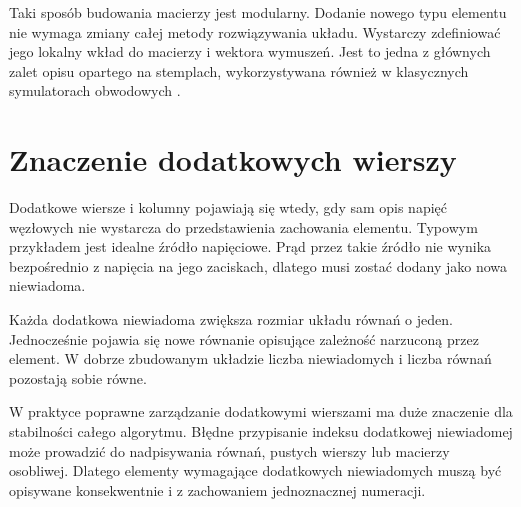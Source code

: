 Taki sposób budowania macierzy jest modularny. Dodanie nowego typu elementu nie wymaga zmiany całej metody rozwiązywania układu. Wystarczy zdefiniować jego lokalny wkład do macierzy i wektora wymuszeń. Jest to jedna z głównych zalet opisu opartego na stemplach, wykorzystywana również w klasycznych symulatorach obwodowych \cite{nagel1975spice2,kundert1995designer}.

\section{Znaczenie dodatkowych wierszy}
\label{sec:znaczenie-dodatkowych-wierszy}

Dodatkowe wiersze i kolumny pojawiają się wtedy, gdy sam opis napięć węzłowych nie wystarcza do przedstawienia zachowania elementu. Typowym przykładem jest idealne źródło napięciowe. Prąd przez takie źródło nie wynika bezpośrednio z napięcia na jego zaciskach, dlatego musi zostać dodany jako nowa niewiadoma.

Każda dodatkowa niewiadoma zwiększa rozmiar układu równań o jeden. Jednocześnie pojawia się nowe równanie opisujące zależność narzuconą przez element. W dobrze zbudowanym układzie liczba niewiadomych i liczba równań pozostają sobie równe.

W praktyce poprawne zarządzanie dodatkowymi wierszami ma duże znaczenie dla stabilności całego algorytmu. Błędne przypisanie indeksu dodatkowej niewiadomej może prowadzić do nadpisywania równań, pustych wierszy lub macierzy osobliwej. Dlatego elementy wymagające dodatkowych niewiadomych muszą być opisywane konsekwentnie i z zachowaniem jednoznacznej numeracji.
